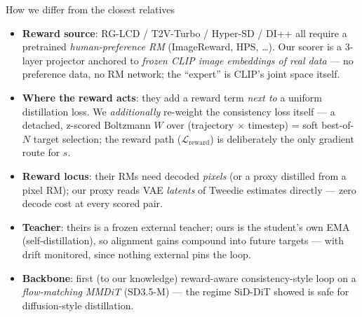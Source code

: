 \documentclass[aspectratio=169,10pt]{beamer}
\begin{document}
\begin{frame}{How we differ from the closest relatives}
  \begin{itemize}
    \item \textbf{Reward source}: RG-LCD / T2V-Turbo / Hyper-SD / DI++ all
      require a pretrained \emph{human-preference RM} (ImageReward, HPS,
      \dots). Our scorer is a 3-layer projector anchored to \emph{frozen CLIP
      image embeddings of real data} --- no preference data, no RM network;
      the ``expert'' is CLIP's joint space itself.
    \item \textbf{Where the reward acts}: they add a reward term
      \emph{next to} a uniform distillation loss. We \emph{additionally}
      re-weight the consistency loss itself --- a detached, z-scored
      Boltzmann $W$ over (trajectory $\times$ timestep) = soft best-of-$N$
      target selection; the reward path
      ($\mathcal{L}_{\mathrm{reward}}$) is deliberately the only
      gradient route for $s$.
    \item \textbf{Reward locus}: their RMs need decoded \emph{pixels} (or a
      proxy distilled from a pixel RM); our proxy reads VAE \emph{latents} of
      Tweedie estimates directly --- zero decode cost at every scored pair.
    \item \textbf{Teacher}: theirs is a frozen external teacher; ours is the
      student's own EMA (self-distillation), so alignment gains compound into
      future targets --- with drift monitored, since nothing external pins
      the loop.
    \item \textbf{Backbone}: first (to our knowledge) reward-aware
      consistency-style loop on a \emph{flow-matching MMDiT} (SD3.5-M) ---
      the regime SiD-DiT showed is safe for diffusion-style distillation.
  \end{itemize}
\end{frame}
\end{document}
